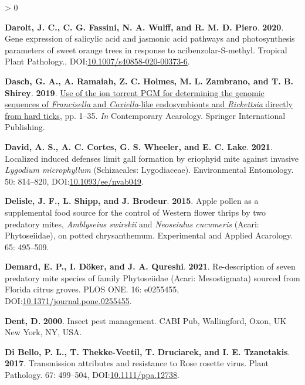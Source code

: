 \documentclass{ufdissertation}[overrideChapters] %
\newlength{\cslhangindent}
\newenvironment{CSLReferences}[2] %
 {%
  \setlength{\parindent}{0pt}
  \ifodd #1 \everypar{\setlength{\hangindent}{\cslhangindent}}\ignorespaces\fi
  \ifnum #2 > 0
  \setlength{\parskip}{#2\baselineskip}
  \fi
 }%
 {}
\begin{document}
{\begin{CSLReferences}{1}{1}
\leavevmode{}%
\textbf{Darolt, J. C., C. G. Fassini, N. A. Wulff, and R. M. D. Piero}. \textbf{2020}. Gene expression of salicylic acid and jasmonic acid pathways and photosynthesis parameters of sweet orange trees in response to acibenzolar-{S}-methyl. Tropical Plant Pathology., DOI:\href{https://doi.org/10.1007/s40858-020-00373-6}{10.1007/s40858-020-00373-6}.

\leavevmode{}%
\textbf{Dasch, G. A., A. Ramaiah, Z. C. Holmes, M. L. Zambrano, and T. B. Shirey}. \textbf{2019}. \href{https://doi.org/10.1007/978-3-030-17265-7_1}{Use of the ion torrent {PGM} for determining the genomic sequences of {\emph{Francisella}} and {\emph{Coxiella}}-like endosymbionts and {\emph{Rickettsia}} directly from hard ticks}, pp. 1--35. \emph{In} Contemporary Acarology. Springer International Publishing.

\leavevmode{}%
\textbf{David, A. S., A. C. Cortes, G. S. Wheeler, and E. C. Lake}. \textbf{2021}. Localized induced defenses limit gall formation by eriophyid mite against invasive {\emph{Lygodium microphyllum}} ({Schizaeales}: {Lygodiaceae}). Environmental Entomology. 50: 814--820, DOI:\href{https://doi.org/10.1093/ee/nvab049}{10.1093/ee/nvab049}.

\leavevmode{}%
\textbf{Delisle, J. F., L. Shipp, and J. Brodeur}. \textbf{2015}. Apple pollen as a supplemental food source for the control of {Western flower thrips} by two predatory mites, {\emph{Amblyseius swirskii}} and {\emph{Neoseiulus cucumeris}} {({Acari}: {Phytoseiidae})}, on potted chrysanthemum. Experimental and Applied Acarology. 65: 495--509.

\leavevmode{}%
\textbf{Demard, E. P., I. Döker, and J. A. Qureshi}. \textbf{2021}. Re-description of seven predatory mite species of family {Phytoseiidae} ({Acari}: {Mesostigmata}) sourced from {Florida} citrus groves. {PLOS} {ONE}. 16: e0255455, DOI:\href{https://doi.org/10.1371/journal.pone.0255455}{10.1371/journal.pone.0255455}.

\leavevmode{}%
\textbf{Dent, D.} \textbf{2000}. Insect pest management. CABI Pub, Wallingford, Oxon, UK New York, NY, USA.

\leavevmode{}%
\textbf{Di Bello, P. L., T. Thekke-Veetil, T. Druciarek, and I. E. Tzanetakis}. \textbf{2017}. Transmission attributes and resistance to {Rose rosette virus}. Plant Pathology. 67: 499--504, DOI:\href{https://doi.org/10.1111/ppa.12738}{10.1111/ppa.12738}.


\end{CSLReferences}}
\end{document}
